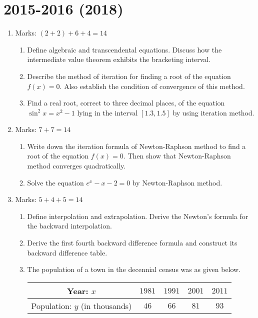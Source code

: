 \documentclass[12pt,class=book,crop=false]{standalone}
\begin{document}
\section*{2015-2016 (2018)}
\begin{enumerate}
    \item Marks: $ (2+2)+6+4=14 $
    \begin{enumerate}
        \item Define algebraic and transcendental equations. Discuss how the intermediate value theorem exhibits the bracketing interval.
        \item Describe the method of iteration for finding a root of the equation $ f(x) = 0 $. Also establish the condition of convergence of this method.
        \item Find a real root, correct to three decimal places, of the equation $ \sin^2 x = x^2 - 1 $ lying in the interval $ [1.3, 1.5] $ by using iteration method.
    \end{enumerate}
    \item Marks: $ 7+7=14 $
    \begin{enumerate}
        \item Write down the iteration formula of Newton-Raphson method to find a root of the equation $ f(x) = 0 $. Then show that Newton-Raphson method converges quadratically.
        \item Solve the equation $ e^x -x-2 = 0 $ by Newton-Raphson method.
    \end{enumerate}
    \item Marks: $ 5+4+5=14 $
    \begin{enumerate}
        \item Define interpolation and extrapolation. Derive the Newton's formula for the backward interpolation.
        \item Derive the first fourth backward difference formula and construct its backward difference table.
        \item The population of a town in the decennial census was as given below.
        \begin{table}[H]
            \centering
            \begin{tabular}{|c|c|c|c|c|}
                \hline
                Year: $ x $& $ 1981 $ &$ 1991 $ &$  2001 $ &$ 2011 $\\\hline
                Population: $ y $ (in thousands)& $ 46 $& $ 66 $ &$ 81 $&$ 93 $\\\hline
            \end{tabular}

\end{table}
\end{enumerate}
\end{enumerate}
\end{document}
